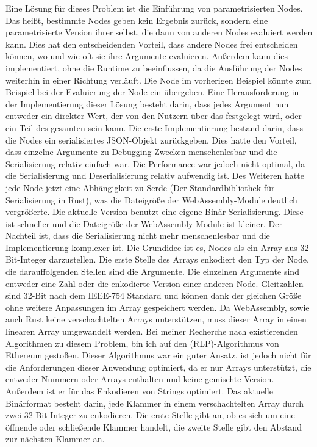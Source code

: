 \documentclass[ngerman]{article}
\begin{document}
Eine Lösung für dieses Problem ist die Einführung von parametrisierten Nodes. Das heißt, bestimmte Nodes geben kein Ergebnis zurück, sondern eine parametrisierte Version ihrer selbst, die dann von anderen Nodes evaluiert werden kann.
\br
Dies hat den entscheidenden Vorteil, dass andere Nodes frei entscheiden können, wo und wie oft sie ihre Argumente evaluieren.
Außerdem kann dies implementiert, ohne die Runtime zu beeinflussen, da die Ausführung der Nodes weiterhin in einer Richtung verläuft.
\br
Die  Node im vorherigen Beispiel könnte zum Beispiel bei der Evaluierung der  Node ein  übergeben.
\br
Eine Herausforderung in der Implementierung dieser Lösung besteht darin, dass jedes Argument nun entweder ein direkter Wert, der von den Nutzern über das  festgelegt wird, oder ein Teil des gesamten  sein kann.
\br
Die erste Implementierung bestand darin, dass die Nodes ein serialisiertes JSON-Objekt zurückgeben. Dies hatte den Vorteil, dass einzelne Argumente zu Debugging-Zwecken menschenlesbar und die Serialisierung relativ einfach war. Die Performance war jedoch nicht optimal, da die Serialisierung und Deserialisierung relativ aufwendig ist. Des Weiteren hatte jede Node jetzt eine Abhängigkeit zu \href{ https://serde.rs/ }{Serde} (Der Standardbibliothek für Serialisierung in Rust), was die Dateigröße der WebAssembly-Module deutlich vergrößerte.
\br
Die aktuelle Version benutzt eine eigene Binär-Serialisierung. Diese ist schneller und die Dateigröße der WebAssembly-Module ist kleiner. Der Nachteil ist, dass die Serialisierung nicht mehr menschenlesbar und die Implementierung komplexer ist. 
\br
Die Grundidee ist es, Nodes als ein Array aus 32-Bit-Integer darzustellen. Die erste Stelle des Arrays enkodiert den Typ der Node, die darauffolgenden Stellen sind die Argumente. Die einzelnen Argumente sind entweder eine Zahl oder die enkodierte Version einer anderen Node.
Gleitzahlen sind 32-Bit nach dem IEEE-754 Standard und können dank der gleichen Größe ohne weitere Anpassungen im Array gespeichert werden. 
\br
Da WebAssembly, sowie auch Rust keine verschachtelten Arrays unterstützen, muss dieser Array in einen linearen Array umgewandelt werden. 
Bei meiner Recherche nach existierenden Algorithmen zu diesem Problem, bin ich auf den  (RLP)-Algorithmus von Ethereum gestoßen. Dieser Algorithmus war ein guter Ansatz, ist jedoch nicht für die Anforderungen dieser Anwendung optimiert, da er nur Arrays unterstützt, die entweder Nummern oder Arrays enthalten und keine gemischte Version. Außerdem ist er für das Enkodieren von Strings optimiert.
\cite{wood2024ethereum}
\br
Das aktuelle Binärformat besteht darin, jede Klammer in einem verschachtelten Array durch zwei 32-Bit-Integer zu enkodieren. 
Die erste Stelle gibt an, ob es sich um eine öffnende oder schließende Klammer handelt, die zweite Stelle gibt den Abstand zur nächsten Klammer an.
\end{document}
